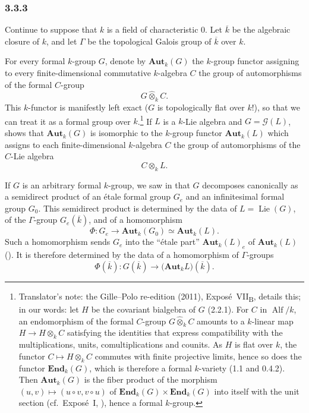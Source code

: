 
\subsubsection*{3.3.3}
\label{sga3:VIIB:3.3.3}

Continue to suppose that \(k\) is a field of characteristic \(0\).
Let \(\overline k\) be the algebraic closure of \(k\), and let
\(\Gamma\) be the topological Galois group of \(\overline k\) over
\(k\).

For every formal \(k\)-group \(G\), denote by
\(\mathbf{Aut}_k(G)\) the \(k\)-group functor assigning to every
finite-dimensional commutative \(k\)-algebra \(C\) the group of
automorphisms of the formal \(C\)-group
\[
  G\widehat\otimes_k C.
\]
This \(k\)-functor is manifestly left exact \textup{(\(G\) is topologically
flat over \(k\)!)}, so that we can treat it as a formal group over
\(k\).\footnote{Translator's note: the Gille--Polo re-edition (2011), Expos\'e~VII\textsubscript{B}, details
this; in our words: let \(H\) be the covariant bialgebra of \(G\) (2.2.1). For \(C\) in
\(\operatorname{Alf}/k\), an endomorphism of the formal \(C\)-group \(G\widehat\otimes_kC\) amounts to a
\(k\)-linear map \(H\to H\otimes_kC\) satisfying the identities that express compatibility with the
multiplications, units, comultiplications and counits. As \(H\) is flat over \(k\), the functor
\(C\mapsto H\otimes_kC\) commutes with finite projective limits, hence so does the functor
\(\mathbf{End}_k(G)\), which is therefore a formal \(k\)-variety (1.1 and 0.4.2). Then \(\mathbf{Aut}_k(G)\)
is the fiber product of the morphism \((u,v)\mapsto(u\circ v,v\circ u)\) of
\(\mathbf{End}_k(G)\times\mathbf{End}_k(G)\) into itself with the unit section (cf.\ Expos\'e~I,
), hence a formal \(k\)-group.}
If \(L\) is a \(k\)-Lie algebra and
\(G=\mathscr G(L)\),  shows that
\(\mathbf{Aut}_k(G)\) is isomorphic to the \(k\)-group functor
\(\mathbf{Aut}_k(L)\) which assigns to each finite-dimensional
\(k\)-algebra \(C\) the group of automorphisms of the
\(C\)-Lie algebra
\[
  C\otimes_k L.
\]

If \(G\) is an arbitrary formal \(k\)-group, we saw in 
that \(G\) decomposes canonically as a semidirect product of an
étale formal group \(G_e\) and an infinitesimal formal group
\(G_0\). This semidirect product is determined by the data of
\(L=\operatorname{Lie}(G)\), of the \(\Gamma\)-group
\(G_e(\overline k)\), and of a homomorphism
\[
  \Phi:
  G_e\longrightarrow
  \mathbf{Aut}_k(G_0)
  \simeq
  \mathbf{Aut}_k(L).
\]
Such a homomorphism sends \(G_e\) into the ``étale part''
\(\mathbf{Aut}_k(L)_e\) of \(\mathbf{Aut}_k(L)\)
\textup{()}. It is therefore determined by the data of a
homomorphism of \(\Gamma\)-groups
\[
  \Phi(\overline k):
  G(\overline k)\longrightarrow
  \bigl(\mathbf{Aut}_kL\bigr)(\overline k).
\]

